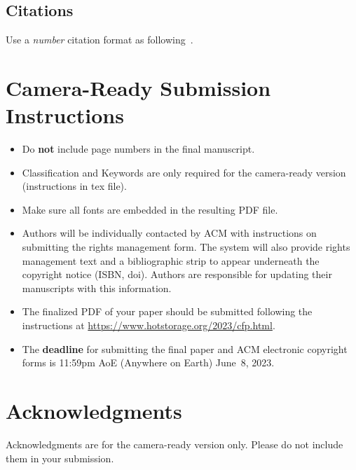\documentclass[sigconf,anonymous,10pt]{acmart}
\begin{document}
\subsection{Citations}

Use a \emph{number} citation format as following~\cite{lamport94,nicepaper,nicepaper2}.

\section{Camera-Ready Submission Instructions}
\begin{itemize}
	
	\item
	Do \textbf{not} include page numbers in the final manuscript.
	
	\item
	Classification and Keywords are only required for the camera-ready version (instructions in tex file).
	
	\item
	Make sure all fonts are embedded in the resulting PDF file.
	
	\item
	Authors will be individually contacted by ACM with instructions on submitting the rights management form. The system will also provide rights management text and a bibliographic strip to appear underneath the copyright notice (ISBN, doi). Authors are responsible for updating their manuscripts with this information.
	
	\item
	The finalized PDF of your paper should be submitted following the instructions at
	\url{https://www.hotstorage.org/2023/cfp.html}.
	
	\item
	The \textbf{deadline} for submitting the final paper and ACM electronic copyright forms is 11:59pm AoE (Anywhere on Earth) June~8, 2023.
\end{itemize}


\section*{Acknowledgments}
Acknowledgments are for the camera-ready version only. Please do not include them in your submission.



\end{document}
